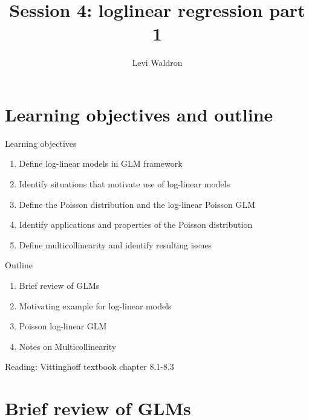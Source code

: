 \documentclass[
  ignorenonframetext,
]{beamer}
\title{Session 4: loglinear regression part 1}
\author{Levi Waldron}
\date{}
\institute{CUNY SPH Biostatistics 2}
\providecommand{\tightlist}{%
  \setlength{\itemsep}{0pt}\setlength{\parskip}{0pt}}
\begin{document}
\frame{\titlepage}

\hypertarget{learning-objectives-and-outline}{%
\section{Learning objectives and
outline}\label{learning-objectives-and-outline}}

\begin{frame}{Learning objectives}
\protect\hypertarget{learning-objectives}{}

\begin{enumerate}
\tightlist
\item
  Define log-linear models in GLM framework
\item
  Identify situations that motivate use of log-linear models
\item
  Define the Poisson distribution and the log-linear Poisson GLM
\item
  Identify applications and properties of the Poisson distribution
\item
  Define multicollinearity and identify resulting issues
\end{enumerate}

\end{frame}

\begin{frame}{Outline}
\protect\hypertarget{outline}{}

\begin{enumerate}
\tightlist
\item
  Brief review of GLMs
\item
  Motivating example for log-linear models
\item
  Poisson log-linear GLM
\item
  Notes on Multicollinearity
\end{enumerate}

Reading: Vittinghoff textbook chapter 8.1-8.3

\end{frame}

\hypertarget{brief-review-of-glms}{%
\section{Brief review of GLMs}\label{brief-review-of-glms}}
\end{document}
